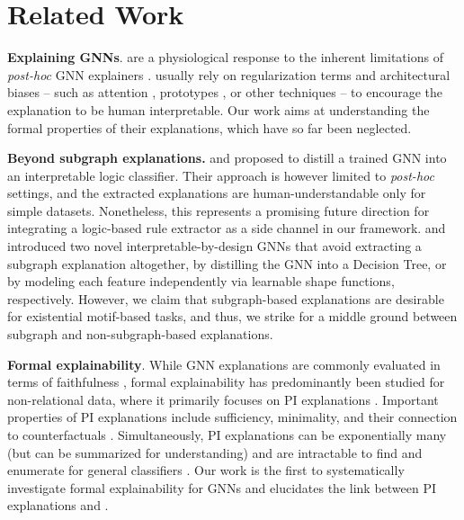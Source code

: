 \section{Related Work}
\label{sec:related-work}

\textbf{Explaining GNNs}. \SEGNNs are a physiological response to the inherent limitations of \textit{post-hoc} GNN explainers \citep{longa2024explaining, li2024underfire}.
%
\SEGNNs usually rely on regularization terms and architectural biases -- such as attention \citep{miao2022interpretable, miao2022interpretablerandom, lin2020graph, serra2022learning, wu2022discovering, chen2024howinterpretable}, prototypes \citep{zhang2022protgnn, ragno2022prototype, dai2021towards, dai2022towards}, or other techniques \citep{yu2020graph, yu2022improving, giunchiglia2022towards, ferrini2024self} -- to encourage the explanation to be human interpretable. 
%
Our work aims at understanding the formal properties of their explanations, which have so far been neglected.


\textbf{Beyond subgraph explanations.} 
%
%
\citet{pluska2024logical} and \citet{kohler2024utilizing} proposed to distill a trained GNN into an interpretable logic classifier.   Their approach is however limited to \textit{post-hoc} settings, and the extracted explanations are human-understandable only for simple datasets.
%
Nonetheless, this represents a promising future direction for integrating a logic-based rule extractor as a side channel in our \GLSSEGNNs framework.
%
\citet{Muller2023graphchef} and \citet{bechler-speicher2024gnan} introduced two novel interpretable-by-design GNNs that avoid extracting a subgraph explanation altogether, by distilling the GNN into a Decision Tree, or by modeling each feature independently via learnable shape functions, respectively.
%
However, we claim that subgraph-based explanations are desirable for existential motif-based tasks, and thus, we %
strike for a middle ground between subgraph and non-subgraph-based explanations.


\textbf{Formal explainability}.  While GNN explanations are commonly evaluated in terms of faithfulness \citep{agarwal2023evaluating, christiansen2023faithful, azzolin2024perkspitfalls}, formal explainability has predominantly been studied for non-relational data, where it primarily focuses on PI explanations \citep{marques2023logic, darwiche2023complete, wang2021probabilistic}.
%
Important properties of PI explanations include sufficiency, minimality, and their connection to counterfactuals \citep{marques2022delivering}.  Simultaneously, PI explanations can be exponentially many (but can be summarized \citep{yu2023formal} for understanding) and are intractable to find and enumerate for general classifiers \citep{marques2023logic}.
%
Our work is the first to systematically investigate formal explainability for GNNs and elucidates the link between PI explanations and \SEGNNs.


